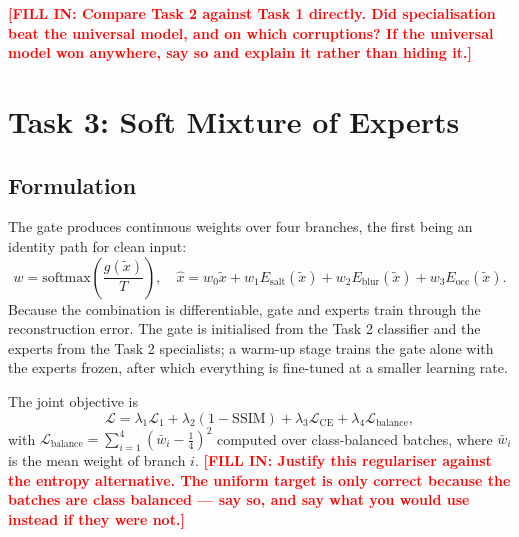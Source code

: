 \documentclass[conference]{IEEEtran}
\newcommand{\PLACEHOLDER}[1]{\textcolor{red}{\textbf{[FILL IN: #1]}}}
\begin{document}
\PLACEHOLDER{Compare Task 2 against Task 1 directly. Did specialisation beat
the universal model, and on which corruptions? If the universal model won
anywhere, say so and explain it rather than hiding it.}

\section{Task 3: Soft Mixture of Experts}
\subsection{Formulation}
The gate produces continuous weights over four branches, the first being an
identity path for clean input:
\begin{equation}
w = \mathrm{softmax}\!\left(\frac{g(\tilde{x})}{T}\right),\quad
\hat{x} = w_0\tilde{x} + w_1 E_{\text{salt}}(\tilde{x})
  + w_2 E_{\text{blur}}(\tilde{x}) + w_3 E_{\text{occ}}(\tilde{x}).
\end{equation}
Because the combination is differentiable, gate and experts train through the
reconstruction error. The gate is initialised from the Task 2 classifier and
the experts from the Task 2 specialists; a warm-up stage trains the gate alone
with the experts frozen, after which everything is fine-tuned at a smaller
learning rate.

The joint objective is
\begin{equation}
\mathcal{L} = \lambda_1 \mathcal{L}_1 + \lambda_2 (1-\mathrm{SSIM})
  + \lambda_3 \mathcal{L}_{\text{CE}} + \lambda_4 \mathcal{L}_{\text{balance}},
\end{equation}
with
$\mathcal{L}_{\text{balance}} = \sum_{i=1}^{4} (\bar{w}_i - \tfrac{1}{4})^2$
computed over class-balanced batches, where $\bar{w}_i$ is the mean weight of
branch $i$. \PLACEHOLDER{Justify this regulariser against the entropy
alternative. The uniform target is only correct because the batches are class
balanced --- say so, and say what you would use instead if they were not.}
\end{document}
